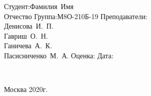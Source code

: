 \begin{titlepage}
\vspace{2em}
{
	\hfill\parbox{11cm}{
		\hspace*{10cm}\hspace*{-5cm}Студент:\hfill\hbox {Фамилия Имя \hfill}\\
		\hspace*{10cm}\hspace*{-5cm}\hfill\hbox {Отчество\hfill}\vspace{2mm}
		\hspace*{10cm}\hspace*{-5cm}Группа:\hfill\hbox {М8О-210Б-19}\vspace{2mm}
		\hspace*{10cm}\hspace*{-5cm}Преподаватели:\\
		\hspace*{10cm}\hspace*{-5cm}\hfill\hbox {Денисова И. П.}\\
		\hspace*{10cm}\hspace*{-5cm}\hfill\hbox {Гавриш О. Н.}\\
		\hspace*{10cm}\hspace*{-5cm}\hfill\hbox {Ганичева А. К.}\\
		\hspace*{10cm}\hspace*{-5cm}\hfill\hbox {Пасисниченко М. А.}\vspace{2mm}
		\hspace*{10cm}\hspace*{-5cm}Оценка:\hfill\hbox {}\vspace{2mm}
		\hspace*{10cm}\hspace*{-5cm}Дата:\hfill\hbox {}\\
	}
\\}

\vspace{\fill}
\begin{center}
Москва 2020г.
\end{center}
\end{titlepage}